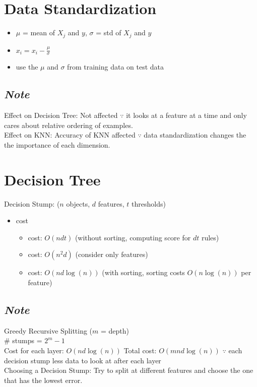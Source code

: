 \documentclass[10pt,landscape,a4paper]{article}
\begin{document}
\begin{multicols*}{5}
\section{Data Standardization}
\begin{itemize}
    \item \(\mu \) = mean of \(X_j\) and \(y\), \(\sigma \) = std of \(X_j\) and \(y\)
    \item \(x_i = x_i - \frac{\mu}{\sigma}\)
    \item use the \(\mu \) and \(\sigma \) from training data on test data
\end{itemize}

\subsection{\emph{Note}}
Effect on Decision Tree: Not affected \(\because \) it looks at a feature at a time and only cares about relative ordering of examples. \\
Effect on KNN: Accuracy of KNN affected \(\because \) data standardization changes the the importance of each dimension.

\section{Decision Tree}
Decision Stump: (\(n\) objects, \(d\) features, \(t\) thresholds)
\begin{itemize}
    \item cost
    \begin{itemize}
        \item cost: \(O(ndt)\) (without sorting, computing score for \(dt\) rules)
        \item cost: \(O(n^2d)\) (consider only features)
        \item cost: \(O(nd \log(n))\) (with sorting, sorting costs \(O(n \log(n))\) per feature)
    \end{itemize}
\end{itemize}

\subsection{\emph{Note}}
Greedy Recursive Splitting (\(m\) = depth) \\
\# stumps = \(2^m - 1\) \\
Cost for each layer: \(O(nd\log(n))\)
Total cost: \(O(mnd\log(n))\) \(\because \) each decision stump less data to look at after each layer \\
Choosing a Decision Stump: Try to split at different features and choose the one that has the lowest error.


\end{multicols*}
\end{document}
